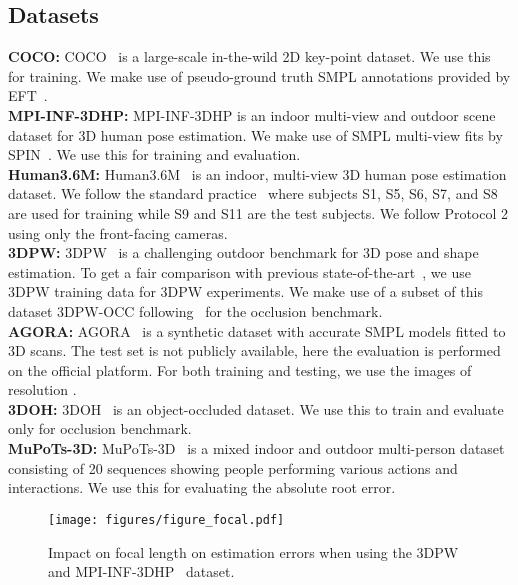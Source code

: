 \documentclass[10pt,twocolumn,letterpaper]{article}
\begin{document}
\subsection{Datasets}\label{datasets}
\noindent\textbf{COCO:} COCO~\cite{coco} is a large-scale in-the-wild 2D key-point dataset. We use this for training. We make use of pseudo-ground truth SMPL annotations provided by EFT~\cite{eft}.
\\\noindent\textbf{MPI-INF-3DHP:} MPI-INF-3DHP is an indoor multi-view and outdoor scene dataset for 3D human pose estimation. We make use of SMPL multi-view fits by SPIN~\cite{spin}. We use this for training and evaluation. 
\\\noindent\textbf{Human3.6M:} Human3.6M~\cite{h36m}
is an indoor, multi-view 3D human pose
estimation dataset.  We follow the standard practice~\cite{hmr,spin} where subjects S1, S5, S6, S7, and S8 are used
for training while S9 and S11 are the test subjects. We follow Protocol 2 using only the front-facing cameras.\\\noindent\textbf{3DPW:} 3DPW~\cite{3dpw} is a challenging outdoor benchmark for 3D pose and shape estimation. To get a fair comparison with previous state-of-the-art~\cite{pare,hybrik}, we use 3DPW training data for 3DPW experiments. We make use of a subset of this dataset 3DPW-OCC following~\cite{pare} for the occlusion benchmark.
\\\noindent\textbf{AGORA:} AGORA~\cite{agora}  is a synthetic dataset with accurate SMPL models fitted to 3D scans. The test set is not publicly available, here the evaluation is performed on the official platform. For both training and testing, we use the images of resolution .
\\\noindent\textbf{3DOH:} 3DOH~\cite{3doh} is an object-occluded dataset. We use this to train and evaluate only for occlusion benchmark.
\\\noindent\textbf{MuPoTs-3D:} MuPoTs-3D~\cite{mupo} is a mixed indoor and outdoor multi-person dataset consisting of 20 sequences showing people performing various actions and interactions. We use this for evaluating the absolute root error.


\begin{figure}
\begin{center}
\texttt{[image: figures/figure\_focal.pdf]}
\end{center}
   \caption{Impact on focal length on estimation errors when using the 3DPW~\cite{3dpw} and MPI-INF-3DHP~\cite{mpiinf} dataset. 
}
\label{fig:focal_vary}
\end{figure}
\end{document}
